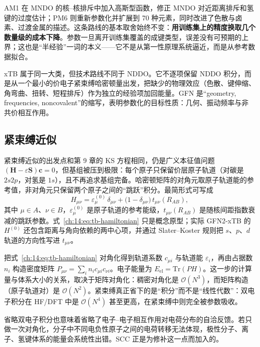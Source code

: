 AM1 在 MNDO 的核--核排斥中加入高斯型函数，修正 MNDO 对近距离排斥和氢键的过度估计\citep{dewar1985am1}；PM6 则重新参数化并扩展到 70 种元素，同时改进了色散与卤素、过渡金属的描述\citep{stewart2007pm6}。这条路线的基本取舍始终不变：\textbf{用训练集上的精度换取几个数量级的成本下降}。参数一旦离开训练集覆盖的成键类型，误差没有可预期的上界；这也是“半经验”一词的本义——它不是从第一性原理系统逼近，而是从参考数据拟合。

xTB 属于同一大类，但技术路线不同于 NDDO。它不逐项保留 NDDO 积分，而是从一个最小的价电子紧束缚哈密顿量出发，把缺少的物理效应（色散、键伸缩、角弯曲、扭转、短程排斥）作为独立的经验项加回能量。GFN 是“geometry, frequencies, noncovalent”的缩写，表明参数化的目标性质：几何、振动频率与非共价相互作用\citep{bannwarth2019gfn2}。

\subsection{紧束缚近似}
\label{ch:14:sec:tight-binding}

紧束缚近似的出发点和第 9 章的 KS 方程相同，仍是广义本征值问题
$(\mathbf{H}-\varepsilon\mathbf{S})\mathbf{c}=0$，但基组被压到极限：每个原子只保留价层原子轨道（对碳是 $2s2p$，对氢是 $1s$），且不再追求基组完备。哈密顿矩阵的对角元取原子轨道能的参考值，非对角元只保留两个原子之间的“跳跃”积分。最简形式可写成
\begin{equation}
H_{\mu\nu}
= \varepsilon_\mu^{(0)}\,\delta_{\mu\nu}
+ \bigl(1-\delta_{\mu\nu}\bigr)\,t_{\mu\nu}(R_{AB}),
\label{ch:14:eq:tb-hamiltonian}
\end{equation}
其中 $\mu\in A$、$\nu\in B$，$\varepsilon_\mu^{(0)}$ 是原子轨道的参考能级，$t_{\mu\nu}(R_{AB})$ 是随核间距指数衰减的跳跃参数。式~\eqref{ch:14:eq:tb-hamiltonian} 只是概念原型；实际 GFN2-xTB 的 $H^{(0)}$ 还包含距离与角向依赖的两中心项，并通过 Slater--Koster 规则把 $s$、$p$、$d$ 轨道的方向性写进 $t_{\mu\nu}$。

把式~\eqref{ch:14:eq:tb-hamiltonian} 对角化得到轨道系数 $c_{\mu i}$ 与轨道能 $\varepsilon_i$，再由占据数 $n_i$ 构造密度矩阵 $P_{\mu\nu}=\sum_i n_i c_{\mu i}c_{\nu i}$。电子能量为 $E_{\mathrm{el}}=\mathrm{Tr}(PH)$。这一步的计算量与体系大小的关系，取决于矩阵对角化：稠密对角化是 $\mathcal{O}(N^3)$，而矩阵构造（原子轨道对）是 $\mathcal{O}(N^2)$。紧束缚真正省下的是“积分”而不是“线性代数”：双电子积分在 HF/DFT 中是 $\mathcal{O}(N^4)$ 甚至更高，在紧束缚中则完全被参数吸收。

省略双电子积分也意味着省略了电子--电子相互作用对电荷分布的自洽反馈。若只做一次对角化，分子中不同电负性原子之间的电荷转移无法体现，极性分子、离子、氢键体系的能量会系统性出错。SCC 正是为修补这一点而加入的。

